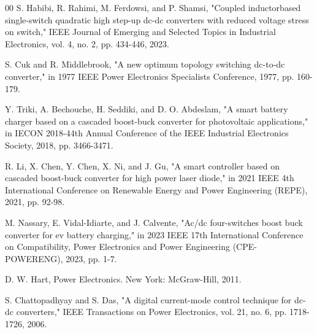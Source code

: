 \documentclass[10pt,conference]{IEEEtran}
\begin{document}
\begin{thebibliography}{00}
S. Habibi, R. Rahimi, M. Ferdowsi, and P. Shamsi, "Coupled inductorbased single-switch quadratic high step-up dc-dc converters with reduced voltage stress on switch," IEEE Journal of Emerging and Selected Topics in Industrial Electronics, vol. 4, no. 2, pp. 434-446, 2023.

S. Cuk and R. Middlebrook, "A new optimum topology switching dc-to-dc converter," in 1977 IEEE Power Electronics Specialists Conference, 1977, pp. 160-179.

Y. Triki, A. Bechouche, H. Seddiki, and D. O. Abdeslam, "A smart battery charger based on a cascaded boost-buck converter for photovoltaic applications," in IECON 2018-44th Annual Conference of the IEEE Industrial Electronics Society, 2018, pp. 3466-3471.

R. Li, X. Chen, Y. Chen, X. Ni, and J. Gu, "A smart controller based on cascaded boost-buck converter for high power laser diode," in 2021 IEEE 4th International Conference on Renewable Energy and Power Engineering (REPE), 2021, pp. 92-98.

M. Nassary, E. Vidal-Idiarte, and J. Calvente, "Ac/dc four-switches boost buck converter for ev battery charging," in 2023 IEEE 17th International Conference on Compatibility, Power Electronics and Power Engineering (CPE-POWERENG), 2023, pp. 1-7.

D. W. Hart, Power Electronics. New York: McGraw-Hill, 2011.

S. Chattopadhyay and S. Das, "A digital current-mode control technique for dc-dc converters," IEEE Transactions on Power Electronics, vol. 21, no. 6, pp. 1718-1726, 2006.


\end{thebibliography}


\page{***}


\copy{***}
\end{document}
